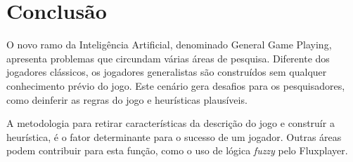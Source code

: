 \section{Conclusão}
O novo ramo da Inteligência Artificial, denominado General Game Playing, apresenta problemas que circundam várias áreas de pesquisa. Diferente dos jogadores clássicos, os jogadores generalistas são construídos sem qualquer conhecimento prévio do jogo. Este cenário gera desafios para os pesquisadores, como deinferir as regras do jogo e heurísticas plausíveis.

A metodologia para retirar características da descrição do jogo e construír a heurística, é o fator determinante para o sucesso de um jogador. Outras áreas podem contribuir para esta função, como o uso de lógica {\it fuzzy} pelo Fluxplayer.
